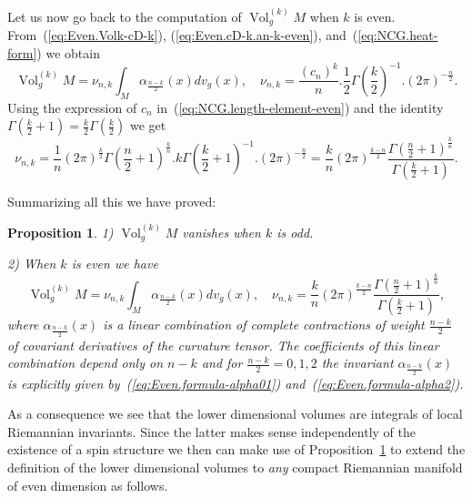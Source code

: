 \documentclass[leqno, 10pt]{amsart}
\newtheorem{proposition}[definition]{Proposition}
\theoremstyle{remark}
\begin{document}
Let us now go back to the computation of ${{\operatorname{{Vol}}}}^{(k)}_{g}M$ when $k$ is even. 
From~(\ref{eq:Even.Volk-cD-k}), (\ref{eq:Even.cD-k.an-k-even}), and~(\ref{eq:NCG.heat-form}) we obtain
\begin{equation}
    {{\operatorname{{Vol}}}}^{(k)}_{g}M= \nu_{n,k}\int_{M}\alpha_{\frac{n-k}{2}}(x)dv_{g}(x), 
    \quad \nu_{n,k}= \frac{(c_{n})^{k}}{n}.\frac{1}{2}\Gamma(\frac{k}{2})^{-1}.(2\pi)^{-\frac{n}{2}}.
     \label{eq:Even.Volkg-nunk}
\end{equation}
Using the expression of $c_{n}$ in~(\ref{eq:NCG.length-element-even}) and the identity $\Gamma(\frac{k}{2}+1)=\frac{k}{2}\Gamma(\frac{k}{2})$ we get
\begin{equation}
    \nu_{n,k}=\frac{1}{n}(2\pi)^{\frac{k}{2}}\Gamma(\frac{n}{2}+1)^{\frac{k}{n}}.k\Gamma(\frac{k}{2}+1)^{-1}.(2\pi)^{-\frac{n}{2}}
    =\frac{k}{n}(2\pi)^{\frac{k-n}{2}}\frac{\Gamma(\frac{n}{2}+1)^{\frac{k}{n}}}{\Gamma(\frac{k}{2}+1)}.
\end{equation}

Summarizing all this we have proved: 

\begin{proposition}\label{prop:Even.main}
1) ${{\operatorname{{Vol}}}}^{(k)}_{g}M$ vanishes when $k$ is odd.\smallskip

2) When $k$ is even we have
\begin{equation}
    {{\operatorname{{Vol}}}}^{(k)}_{g}M=\nu_{n,k}\int_{M}\alpha_{\frac{n-k}{2}}(x)dv_{g}(x), \quad 
    \nu_{n,k}=\frac{k}{n}(2\pi)^{\frac{k-n}{2}}\frac{\Gamma(\frac{n}{2}+1)^{\frac{k}{n}}}{\Gamma(\frac{k}{2}+1)},
\end{equation}
where $\alpha_{\frac{n-k}{2}}(x)$ is  a linear combination of complete contractions of
weight $\frac{n-k}{2}$ of covariant derivatives of the curvature tensor. The coefficients of this linear combination depend only on 
$n-k$ and  for $\frac{n-k}{2}=0,1,2$ the invariant $\alpha_{\frac{n-k}{2}}(x)$  
 is explicitly given by~(\ref{eq:Even.formula-alpha01}) and~(\ref{eq:Even.formula-alpha2}). 
\end{proposition}

As a consequence we see that the lower dimensional volumes are integrals of local Riemannian invariants. Since the latter makes sense independently 
of the existence of a spin structure we then can make use of Proposition~\ref{prop:Even.main} to extend the  definition of the lower 
dimensional volumes to \emph{any} compact Riemannian manifold of even dimension as follows. 
\end{document}
